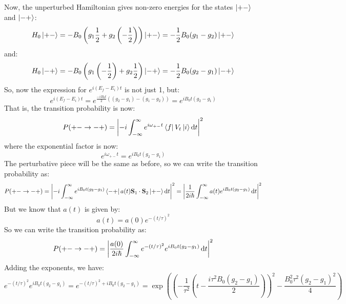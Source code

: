 \documentclass[12pt]{article}
\begin{document}
\subsection{}
Now, the unperturbed Hamiltonian gives non-zero energies for the states $\ket{+-}$ and $\ket{-+}$:
\begin{equation}
  H_0\ket{+-} = -B_0\left(g_1\frac{1}{2} + g_2\left(-\frac{1}{2}\right)\right)\ket{+-} = -\frac{1}{2}B_0(g_1 - g_2)\ket{+-}
\end{equation}
and:
\begin{equation}
  H_0\ket{-+} = -B_0\left(g_1\left(-\frac{1}{2}\right) + g_2\frac{1}{2}\right)\ket{-+} = -\frac{1}{2}B_0(g_2 - g_1)\ket{-+}
\end{equation}
So, now the expression for $e^{i\left(E_f-E_i\right)t}$ is not just 1, but:
\begin{equation}
  e^{i\left(E_f-E_i\right)t} = e^{\frac{-iB_0t}{2}\left((g_2 - g_1) - (g_1 - g_2)\right)} = e^{iB_0t(g_2 - g_1)}
\end{equation}
That is, the transition probability is now:
\begin{equation}
  P(+-\rightarrow-+) = \abs{-i\int_{-\infty}^{\infty} e^{i\omega_{+-}t}\bra{f}V_t\ket{i}\dd{t}}^2
\end{equation}
where the exponential factor is now:
\begin{equation}
  e^{i\omega_{+-}t} = e^{iB_0t(g_2 - g_1)}
\end{equation}
The perturbative piece will be the same as before, so we can write the transition probability as:
\begin{equation}
  P(+-\rightarrow-+) = \abs{-i\int_{-\infty}^{\infty} e^{iB_0t(g_2 - g_1)}\bra{-+}a(t) \mathbf{S}_1 \cdot \mathbf{S}_2\ket{+-}\dd{t}}^2 = \abs{\frac{1}{2i\hbar}\int_{-\infty}^{\infty} a(t)e^{iB_0t(g_2 - g_1)}\dd{t}}^2
\end{equation}
But we know that $a(t)$ is given by:
\begin{equation}
  a(t) = a(0)e^{-(t/\tau)^2}
\end{equation}
So we can write the transition probability as:
\begin{equation}
  P(+-\rightarrow-+) = \abs{\frac{a(0)}{2i\hbar}\int_{-\infty}^{\infty} e^{-(t/\tau)^2}e^{iB_0t(g_2 - g_1)}\dd{t}}^2
\end{equation}
Adding the exponents, we have:
\begin{equation}
  e^{-(t/\tau)^2}e^{iB_0t(g_2 - g_1)} = e^{-(t/\tau)^2 + iB_0t(g_2 - g_1)} = \exp\left(\left(-\frac{1}{\tau^2}\left(t- \frac{i\tau^2 B_0(g_2 - g_1)}{2}\right)\right)^2 - \frac{B_0^2 \tau^2 (g_2 - g_1)^2}{4}\right)
\end{equation}
\end{document}
